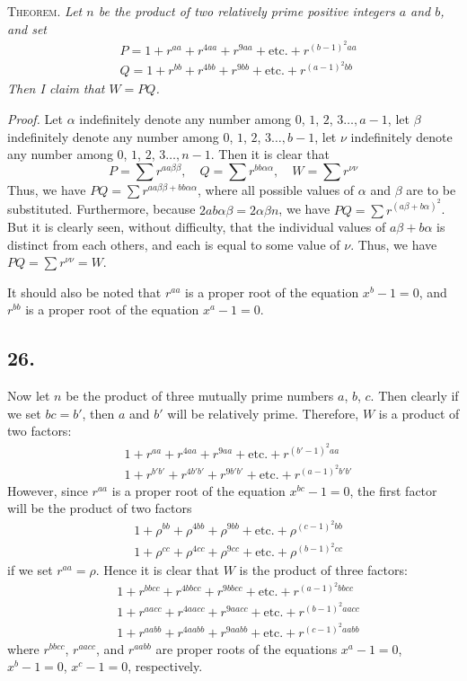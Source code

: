 \documentclass[twoside,12pt]{memoir}
\begin{document}
\textsc{Theorem.} \textit{Let \(n\) be the product of two relatively prime positive integers \(a\) and \(b\), and set}
\[\begin{aligned}
& P=1+r^{a a}+r^{4 a a}+r^{9 a a}+\text{etc{.}}+r^{(b-1)^{2} a a} \\
& Q=1+r^{b b}+r^{4 b b}+r^{9 b b}+\text{etc{.}}+r^{(a-1)^{2} b b}
\end{aligned}\]
\textit{Then I claim that \(W=PQ\).}

\textit{Proof.} Let \(\alpha\) indefinitely denote any number among \(0\), \(1\), \(2\), \(3\ldots, a-1\), let \(\beta\) indefinitely denote any number among \(0\), \(1\), \(2\), \(3\ldots, b-1\), let \(\nu\) indefinitely denote any number among \(0\), \(1\), \(2\), \(3\ldots, n-1\). Then it is clear that
\[P=\sum r^{a a \beta \beta}, \quad Q=\sum r^{b b \alpha \alpha}, \quad W=\sum r^{\nu \nu}\]
Thus, we have \(PQ=\sum r^{a a \beta \beta +b b \alpha \alpha}\), where all possible values of \(\alpha\) and \(\beta\) are to be substituted.  Furthermore, because \(2ab\alpha\beta=2\alpha\beta n\), we have \(PQ=\sum r^{(a \beta+b \alpha)^{2}}\). But it is clearly seen, without difficulty, that the individual values of \(a \beta+b \alpha\) is distinct from each others, and each is equal to some value of \(\nu\). Thus, we have \(PQ=\sum r^{\nu \nu}=W\).

It should also be noted that \(r^{a a}\) is a proper root of the equation \(x^{b}-1=0\), and \(r^{b b}\) is a proper root of the equation \(x^{a}-1=0\).
%

\subsection*{26.}

Now let \(n\) be the product of three mutually prime numbers \(a\), \(b\), \(c\).  Then clearly if we set \(bc = b'\), then \(a\) and \(b'\) will be relatively prime.  Therefore, \(W\) is a product of two factors:
\[\begin{aligned}
& 1+r^{aa}+r^{4aa}+r^{9aa}+\text{etc{.}}+r^{(b'-1)^2aa} \\
& 1+r^{b'b'}+r^{4b'b'}+r^{9b'b'}+\text{etc{.}}+r^{(a-1)^2b'b'}
\end{aligned}\]
However, since \(r^{aa}\) is a proper root of the equation \(x^{bc} - 1 = 0\), the first factor will be the product of two factors
\[\begin{aligned}
& 1+\rho^{bb}+\rho^{4bb}+\rho^{9bb}+\text{etc{.}}+\rho^{(c-1)^2bb} \\
& 1+\rho^{cc}+\rho^{4cc}+\rho^{9cc}+\text{etc{.}}+\rho^{(b-1)^2cc}
\end{aligned}\]
if we set \(r^{aa} = \rho\). Hence it is clear that \(W\) is the product of three factors:
\[\begin{aligned}
& 1+r^{bbcc}+r^{4bbcc}+r^{9bbcc}+\text{etc{.}}+r^{(a-1)^2bbcc} \\
& 1+r^{aacc}+r^{4aacc}+r^{9aacc}+\text{etc{.}}+r^{(b-1)^2aacc} \\
& 1+r^{aabb}+r^{4aabb}+r^{9aabb}+\text{etc{.}}+r^{(c-1)^2aabb}
\end{aligned}\]
where \(r^{bbcc}\), \(r^{aacc}\), and \(r^{aabb}\) are proper roots of the equations \(x^a - 1 = 0\), \(x^b - 1 = 0\), \(x^c - 1 = 0\), respectively.
%
\end{document}
